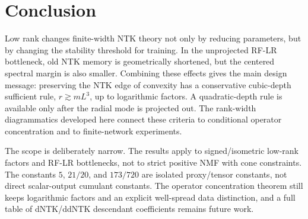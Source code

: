 \documentclass{article}
\begin{document}
\section{Conclusion}
Low rank changes finite-width NTK theory not only by reducing parameters, but by changing the stability threshold for training. In the unprojected RF-LR bottleneck, old NTK memory is geometrically shortened, but the centered spectral margin is also smaller. Combining these effects gives the main design message: preserving the NTK edge of convexity has a conservative cubic-depth sufficient rule, \(r\gtrsim mL^3\), up to logarithmic factors. A quadratic-depth rule is available only after the radial mode is projected out. The rank-width diagrammatics developed here connect these criteria to conditional operator concentration and to finite-network experiments.

The scope is deliberately narrow. The results apply to signed/isometric low-rank factors and RF-LR bottlenecks, not to strict positive NMF with cone constraints. The constants \(5\), \(21/20\), and \(173/720\) are isolated proxy/tensor constants, not direct scalar-output cumulant constants. The operator concentration theorem still keeps logarithmic factors and an explicit well-spread data distinction, and a full table of dNTK/ddNTK descendant coefficients remains future work.
\end{document}
